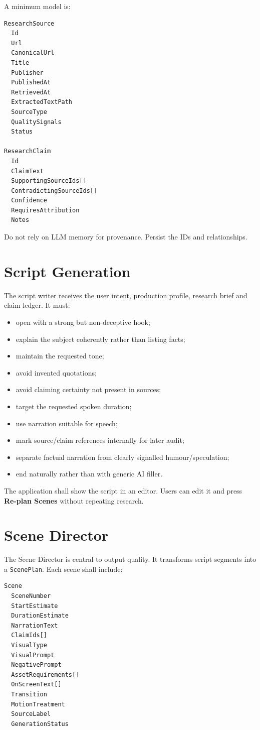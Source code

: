 \documentclass[10pt,journal,compsoc]{IEEEtran}
\begin{document}
A minimum model is:
\begin{verbatim}
ResearchSource
  Id
  Url
  CanonicalUrl
  Title
  Publisher
  PublishedAt
  RetrievedAt
  ExtractedTextPath
  SourceType
  QualitySignals
  Status

ResearchClaim
  Id
  ClaimText
  SupportingSourceIds[]
  ContradictingSourceIds[]
  Confidence
  RequiresAttribution
  Notes
\end{verbatim}

Do not rely on LLM memory for provenance. Persist the IDs and relationships.

\section{Script Generation}

The script writer receives the user intent, production profile, research brief and claim ledger. It must:
\begin{itemize}
    \item open with a strong but non-deceptive hook;
    \item explain the subject coherently rather than listing facts;
    \item maintain the requested tone;
    \item avoid invented quotations;
    \item avoid claiming certainty not present in sources;
    \item target the requested spoken duration;
    \item use narration suitable for speech;
    \item mark source/claim references internally for later audit;
    \item separate factual narration from clearly signalled humour/speculation;
    \item end naturally rather than with generic AI filler.
\end{itemize}

The application shall show the script in an editor. Users can edit it and press \textbf{Re-plan Scenes} without repeating research.

\section{Scene Director}

The Scene Director is central to output quality. It transforms script segments into a \texttt{ScenePlan}. Each scene shall include:
\begin{verbatim}
Scene
  SceneNumber
  StartEstimate
  DurationEstimate
  NarrationText
  ClaimIds[]
  VisualType
  VisualPrompt
  NegativePrompt
  AssetRequirements[]
  OnScreenText[]
  Transition
  MotionTreatment
  SourceLabel
  GenerationStatus
\end{verbatim}
\end{document}
